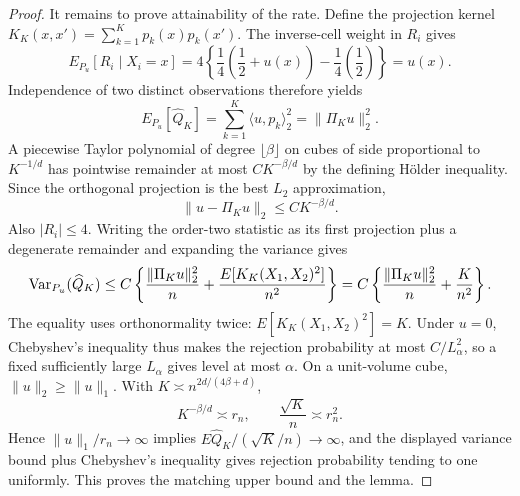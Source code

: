 \documentclass{article}
\begin{document}
\begin{proof}
It remains to prove attainability of the rate. Define the projection kernel \(K_K(x,x')=\sum_{k=1}^Kp_k(x)p_k(x')\). The inverse-cell weight in \(R_i\) gives\[E_{P_u}[R_i\mid X_i=x]=4\left\{\frac14\left(\frac12+u(x)\right)-\frac14\left(\frac12\right)\right\}=u(x).\]Independence of two distinct observations therefore yields\[E_{P_u}[\widehat Q_K]=\sum_{k=1}^K\langle u,p_k\rangle_2^2=\lVert\Pi_Ku\rVert_2^2.\]A piecewise Taylor polynomial of degree \(\lfloor\beta\rfloor\) on cubes of side proportional to \(K^{-1/d}\) has pointwise remainder at most \(C K^{-\beta/d}\) by the defining Hölder inequality. Since the orthogonal projection is the best \(L_2\) approximation,\[\lVert u-\Pi_Ku\rVert_2\le C K^{-\beta/d}.\]Also \(|R_i|\le4\). Writing the order-two statistic as its first projection plus a degenerate remainder and expanding the variance gives\[
\makebox[\linewidth][c]{\resizebox{0.98\linewidth}{!}{\par\noindent \makebox[\linewidth][c]{\resizebox{0.98\linewidth}{!}{\(\displaystyle \displaystyle \operatorname{Var}_{P_u}(\widehat Q_K)\le C\left\{\frac{\lVert\Pi_Ku\rVert_2^2}{n}+\frac{E[K_K(X_1,X_2)^2]}{n^2}\right\}=C\left\{\frac{\lVert\Pi_Ku\rVert_2^2}{n}+\frac K{n^2}\right\}.\)}}\par\noindent}}
\]The equality uses orthonormality twice: \(E[K_K(X_1,X_2)^2]=K\). Under \(u=0\), Chebyshev's inequality thus makes the rejection probability at most \(C/L_\alpha^2\), so a fixed sufficiently large \(L_\alpha\) gives level at most \(\alpha\). On a unit-volume cube, \(\lVert u\rVert_2\ge\lVert u\rVert_1\). With \(K\asymp n^{2d/(4\beta+d)}\),\[K^{-\beta/d}\asymp r_n,\qquad \frac{\sqrt K}{n}\asymp r_n^2.\]Hence \(\lVert u\rVert_1/r_n\to\infty\) implies \(E\widehat Q_K/(\sqrt K/n)\to\infty\), and the displayed variance bound plus Chebyshev's inequality gives rejection probability tending to one uniformly. This proves the matching upper bound and the lemma.
\end{proof}
\end{document}
